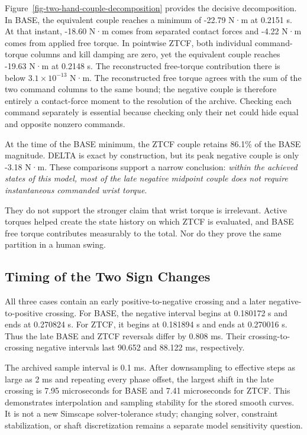 \documentclass[
  letterpaper,
]{report}
\begin{document}
Figure~\ref{fig-two-hand-couple-decomposition} provides the decisive
decomposition. In BASE, the equivalent couple reaches a minimum of
-22.79 N·m at 0.2151 s. At that instant, -18.60 N·m comes from separated
contact forces and -4.22 N·m comes from applied free torque. In
pointwise ZTCF, both individual command-torque columns and kill damping
are zero, yet the equivalent couple reaches -19.63 N·m at 0.2148 s. The
reconstructed free-torque contribution there is below
\(3.1\times10^{-13}\) N·m. The reconstructed free torque agrees with the
sum of the two command columns to the same bound; the negative couple is
therefore entirely a contact-force moment to the resolution of the
archive. Checking each command separately is essential because checking
only their net could hide equal and opposite nonzero commands.

At the time of the BASE minimum, the ZTCF couple retains 86.1\% of the
BASE magnitude. DELTA is exact by construction, but its peak negative
couple is only -3.18 N·m. These comparisons support a narrow conclusion:
\emph{within the achieved states of this model, most of the late
negative midpoint couple does not require instantaneous commanded wrist
torque}.

They do not support the stronger claim that wrist torque is irrelevant.
Active torques helped create the state history on which ZTCF is
evaluated, and BASE free torque contributes measurably to the total. Nor
do they prove the same partition in a human swing.

\subsection{Timing of the Two Sign
Changes}\label{sec-two-hand-crossings}

All three cases contain an early positive-to-negative crossing and a
later negative-to-positive crossing. For BASE, the negative interval
begins at 0.180172 s and ends at 0.270824 s. For ZTCF, it begins at
0.181894 s and ends at 0.270016 s. Thus the late BASE and ZTCF reversals
differ by 0.808 ms. Their crossing-to-crossing negative intervals last
90.652 and 88.122 ms, respectively.

The archived sample interval is 0.1 ms. After downsampling to effective
steps as large as 2 ms and repeating every phase offset, the largest
shift in the late crossing is 7.95 microseconds for BASE and 7.41
microseconds for ZTCF. This demonstrates interpolation and sampling
stability for the stored smooth curves. It is not a new Simscape
solver-tolerance study; changing solver, constraint stabilization, or
shaft discretization remains a separate model sensitivity question.
\end{document}
